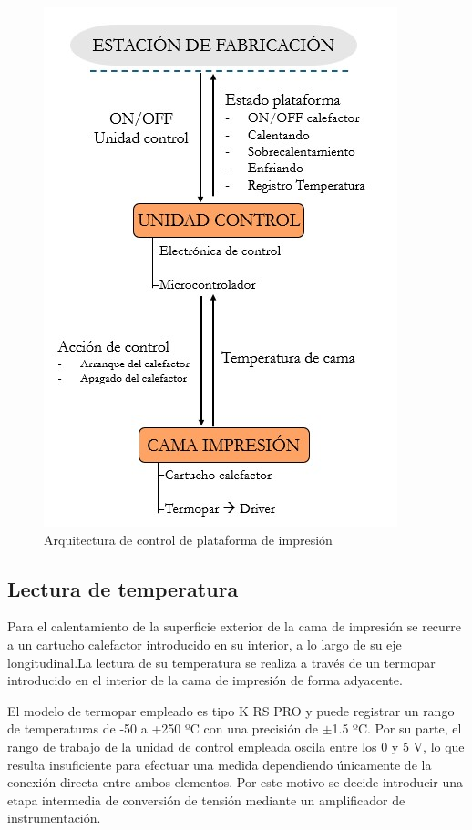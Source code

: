 \begin{figure}[h!]
    \centering
    \includegraphics[scale=0.5]{figuras/arquitectura plataforma impresion.jpg}
    \caption{Arquitectura de control de plataforma de impresión}
    \label{fig:arquitectura plataforma impresión}
\end{figure}

\subsection{Lectura de temperatura}
Para el calentamiento de la superficie exterior de la cama de impresión se recurre a un cartucho calefactor introducido en su interior, a lo largo de su eje longitudinal.La lectura de su temperatura se realiza a través de un termopar introducido en el interior de la cama de impresión de forma adyacente. 

El modelo de termopar empleado es tipo K RS PRO \cite{RS_Online_Termopar_2024} y puede registrar un rango de temperaturas de -50 a +250 ºC con una precisión de $\pm$1.5 ºC. Por su parte, el rango de trabajo de la unidad de control empleada oscila entre los 0 y 5 V, lo que resulta insuficiente para efectuar una medida dependiendo únicamente de la conexión directa entre ambos elementos. Por este motivo se decide introducir una etapa intermedia de conversión de tensión mediante un amplificador de instrumentación. 

